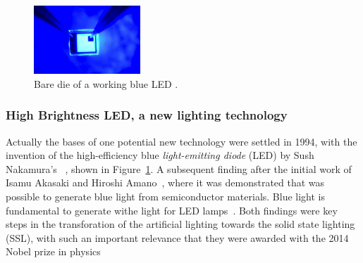 \begin{figure}[!h]
\centering
\includegraphics[width=4cm]{./0_intro/img/10-7-14-nobel-prize-blue-led.jpg}
\caption{Bare die of a working blue LED  .}
\label{fig:blue_LED}
\end{figure}

\subsubsection{High Brightness LED, a new lighting technology}
Actually the bases of one potential new technology were settled  in 1994, with the invention of the high-efficiency blue \emph{light-emitting diode} (LED) by Sush Nakamura's ~\cite{94Nakamura}, shown in Figure~\ref{fig:blue_LED}. A subsequent finding after the initial work of Isamu Akasaki and Hiroshi Amano~\cite{94akasaki}, where it was  demonstrated that was possible to generate blue light from semiconductor materials. Blue light is fundamental to generate withe light for LED lamps~\cite{02narukawa}. Both findings were key steps in the transforation of the artificial lighting towards the solid state lighting (SSL), with such an important relevance that they were awarded with the 2014 Nobel prize in physics~\cite{14NobelPhy}

